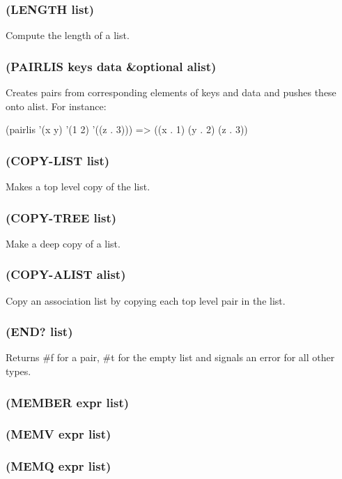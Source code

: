 \documentclass[11pt]{article}
\begin{document}
\subsubsection{(LENGTH list)}
\label{sec-4-13-19}

Compute the length of a list.
\subsubsection{(PAIRLIS keys data \&optional alist)}
\label{sec-4-13-20}

Creates pairs from corresponding elements of keys and data and pushes
these onto alist.  For instance:

(pairlis '(x y) '(1 2) '((z . 3)))  =>  ((x . 1) (y . 2) (z . 3))
\subsubsection{(COPY-LIST list)}
\label{sec-4-13-21}

Makes a top level copy of the list.
\subsubsection{(COPY-TREE list)}
\label{sec-4-13-22}

Make a deep copy of a list.
\subsubsection{(COPY-ALIST alist)}
\label{sec-4-13-23}

Copy an association list by copying each top level pair in the list.
\subsubsection{(END? list)}
\label{sec-4-13-24}

Returns \#f for a pair, \#t for the empty list and signals an error for
all other types.
\subsubsection{(MEMBER expr list)}
\label{sec-4-13-25}
\subsubsection{(MEMV expr list)}
\label{sec-4-13-26}
\subsubsection{(MEMQ expr list)}
\label{sec-4-13-27}
\end{document}
